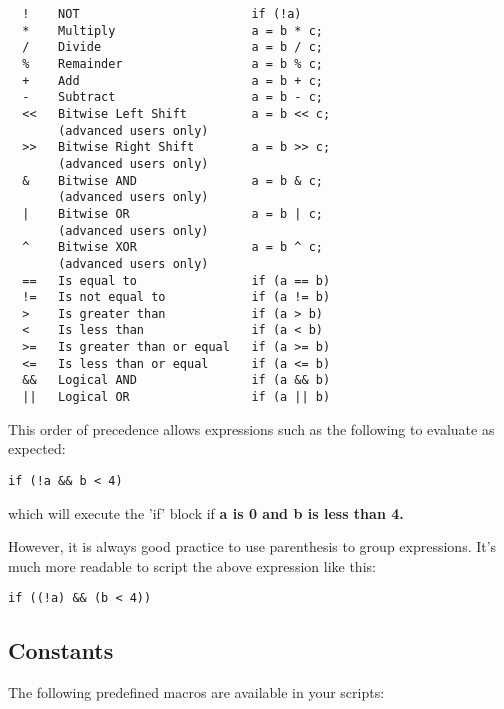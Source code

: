 \begin{verbatim}
  !    NOT                        if (!a)
  *    Multiply                   a = b * c;
  /    Divide                     a = b / c;
  %    Remainder                  a = b % c;
  +    Add                        a = b + c;
  -    Subtract                   a = b - c;
  <<   Bitwise Left Shift         a = b << c;
       (advanced users only)
  >>   Bitwise Right Shift        a = b >> c;
       (advanced users only)
  &    Bitwise AND                a = b & c;
       (advanced users only)
  |    Bitwise OR                 a = b | c;
       (advanced users only)
  ^    Bitwise XOR                a = b ^ c;
       (advanced users only)
  ==   Is equal to                if (a == b)
  !=   Is not equal to            if (a != b)
  >    Is greater than            if (a > b)
  <    Is less than               if (a < b)
  >=   Is greater than or equal   if (a >= b)
  <=   Is less than or equal      if (a <= b)
  &&   Logical AND                if (a && b)
  ||   Logical OR                 if (a || b)
\end{verbatim}

This order of precedence allows expressions such as the following to evaluate as expected:

\verb$if (!a && b < 4)$

which will execute the 'if' block if \bf{a} is 0 and \bf{b} is less than 4.

However, it is always good practice to use parenthesis to group expressions. It's much
more readable to script the above expression like this:

\verb$if ((!a) && (b < 4))$



\subsection{Constants}\label{Constants}%

The following predefined macros are available in your scripts:

